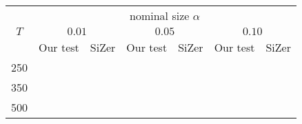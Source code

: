 % 
\begin{tabular}{|c|cc|cc|cc|}
  \hline
  & \multicolumn{6}{|c|}{nominal size $\alpha$} \\
 \cline{2-7} $T$ & \multicolumn{2}{|c|}{$0.01$} & \multicolumn{2}{|c|}{$0.05$} & \multicolumn{2}{|c|}{$0.10$} \\
  & Our test & SiZer & Our test & SiZer & Our test & SiZer \\
 \hline
250 &  &  &  &  &  &  \\ 
  350 &  &  &  &  &  &  \\ 
  500 &  &  &  &  &  &  \\ 
   \hline
\end{tabular}
